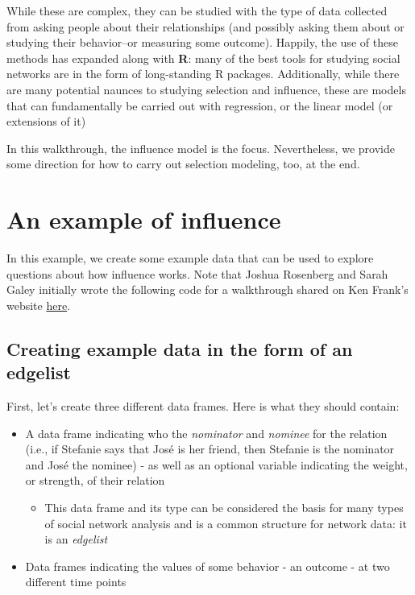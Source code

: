 \documentclass[]{book}
\providecommand{\tightlist}{%
  \setlength{\itemsep}{0pt}\setlength{\parskip}{0pt}}
\begin{document}
While these are complex, they can be studied with the type of data
collected from asking people about their relationships (and possibly
asking them about or studying their behavior--or measuring some
outcome). Happily, the use of these methods has expanded along with
\textbf{R}: many of the best tools for studying social networks are in
the form of long-standing R packages. Additionally, while there are many
potential naunces to studying selection and influence, these are models
that can fundamentally be carried out with regression, or the linear
model (or extensions of it)

In this walkthrough, the influence model is the focus. Nevertheless, we
provide some direction for how to carry out selection modeling, too, at
the end.

\section{An example of influence}\label{an-example-of-influence}

In this example, we create some example data that can be used to explore
questions about how influence works. Note that Joshua Rosenberg and
Sarah Galey initially wrote the following code for a walkthrough shared
on Ken Frank's website
\href{https://msu.edu/~kenfrank/resources.htm}{here}.

\subsection{Creating example data in the form of an
edgelist}\label{creating-example-data-in-the-form-of-an-edgelist}

First, let's create three different data frames. Here is what they
should contain:

\begin{itemize}
\tightlist
\item
  A data frame indicating who the \emph{nominator} and \emph{nominee}
  for the relation (i.e., if Stefanie says that José is her friend, then
  Stefanie is the nominator and José the nominee) - as well as an
  optional variable indicating the weight, or strength, of their
  relation

  \begin{itemize}
  \tightlist
  \item
    This data frame and its type can be considered the basis for many
    types of social network analysis and is a common structure for
    network data: it is an \emph{edgelist}
  \end{itemize}
\item
  Data frames indicating the values of some behavior - an outcome - at
  two different time points
\end{itemize}
\end{document}
